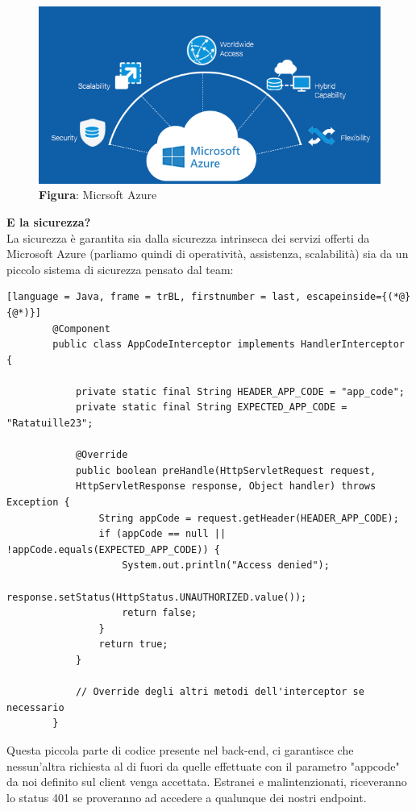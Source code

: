     \begin{figure}[H]
        \centering
        \includegraphics[scale=0.5]{assets/immagini varie/azure loc.png}
        \caption*{\textbf{Figura}: Micrsoft Azure}\label{fig:mic_az}
    \end{figure}
    \newpage
    \begin{flushleft}
        \textbf{E la sicurezza?}\\
        La sicurezza è garantita sia dalla sicurezza intrinseca dei servizi offerti da Microsoft Azure (parliamo quindi di operatività, assistenza, scalabilità) sia da un piccolo sistema di sicurezza pensato dal team:
    \end{flushleft}

    \begin{lstlisting}[language = Java, frame = trBL, firstnumber = last, escapeinside={(*@}{@*)}]
        @Component
        public class AppCodeInterceptor implements HandlerInterceptor {

            private static final String HEADER_APP_CODE = "app_code";
            private static final String EXPECTED_APP_CODE = "Ratatuille23";

            @Override
            public boolean preHandle(HttpServletRequest request, 
            HttpServletResponse response, Object handler) throws Exception {
                String appCode = request.getHeader(HEADER_APP_CODE);
                if (appCode == null || !appCode.equals(EXPECTED_APP_CODE)) {
                    System.out.println("Access denied");
                    response.setStatus(HttpStatus.UNAUTHORIZED.value());
                    return false;
                }
                return true;
            }
            
            // Override degli altri metodi dell'interceptor se necessario
        }
    \end{lstlisting}
    

    \begin{flushleft}
        Questa piccola parte di codice presente nel back-end, ci garantisce che nessun'altra richiesta al di fuori da 
        quelle effettuate con il parametro "appcode" da noi definito sul client venga accettata.
        Estranei e malintenzionati, riceveranno lo status 401 se proveranno ad accedere a qualunque dei nostri endpoint.
    
    \end{flushleft}

   
        
    